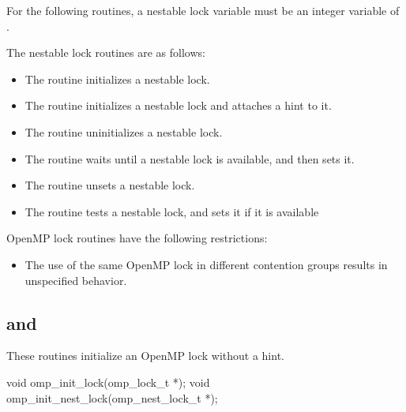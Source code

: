 \fortranspecificstart
For the following routines, a nestable lock variable must be an integer variable of 
.
\fortranspecificend

The nestable lock routines are as follows:

\begin{itemize}
\item The  routine initializes a nestable lock.

\item The  routine initializes a nestable lock and attaches a hint to it.

\item The  routine uninitializes a nestable lock.

\item The  routine waits until a nestable lock is available, and then 
sets it.

\item The  routine unsets a nestable lock.

\item The  routine tests a nestable lock, and sets it if it is 
available
\end{itemize}

\restrictions
OpenMP lock routines have the following restrictions:

\begin{itemize}
\item The use of the same OpenMP lock in different contention groups results in 
unspecified behavior. 
\end{itemize}










\subsection{ and }
\label{subsec:omp_init_lock and omp_init_nest_lock}
\summary
These routines initialize an OpenMP lock without a hint.

\format
\ccppspecificstart
\begin{boxedcode}
void omp\_init\_lock(omp\_lock\_t *);
void omp\_init\_nest\_lock(omp\_nest\_lock\_t *);
\end{boxedcode}
\ccppspecificend


